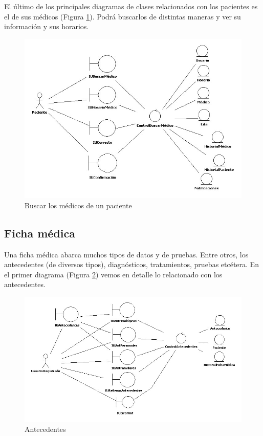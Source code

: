 \documentclass[a4paper,oneside,11pt]{book}
\begin{document}
	\newpage
	El último de los principales diagramas de clases relacionados con los pacientes es el de sus médicos (Figura \ref{fig:col_clase12}). Podrá buscarlos de distintas maneras y ver su información y sus horarios.
	\begin{figure}[H]
	  \centering
	    \includegraphics[width=16cm]{img/jpg/clases/11_PacientesMedicos.jpg}
	  \caption{Buscar los médicos de un paciente}
	  \label{fig:col_clase12}
	\end{figure}
	
	\newpage
	\subsection{Ficha médica} %
	\label{sub:ficha_medica}
	
		Una ficha médica abarca muchos tipos de datos y de pruebas. Entre otros, los antecedentes (de diversos tipos), diagnósticos, tratamientos, pruebas etcétera. En el primer diagrama (Figura \ref{fig:col_clase13}) vemos en detalle lo relacionado con los antecedentes.
		\begin{figure}[H]
		  \centering
		    \includegraphics[width=16cm]{img/jpg/clases/12_Antecedentes.jpg}
		  \caption{Antecedentes}
		  \label{fig:col_clase13}
		\end{figure}
\end{document}
